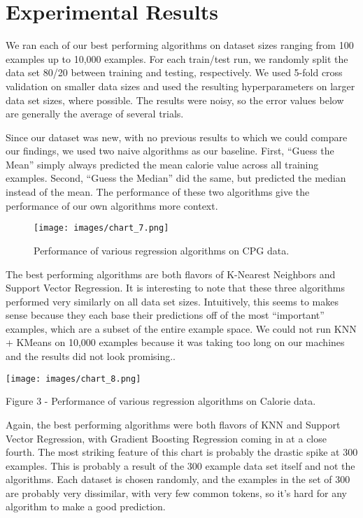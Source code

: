\documentclass{article}
\begin{document}
\section{Experimental Results}
We ran each of our best performing algorithms on dataset sizes ranging from 100 examples up to 10,000 examples. For each train/test run, we randomly split the data set 80/20 between training and testing, respectively. We used 5-fold cross validation on smaller data sizes and used the resulting hyperparameters on larger data set sizes, where possible. The results were noisy, so the error values below are generally the average of several trials.

Since our dataset was new, with no previous results to which we could compare our findings, we used two naive algorithms as our baseline. First, “Guess the Mean” simply always predicted the mean calorie value across all training examples. Second, “Guess the Median” did the same, but predicted the median instead of the mean. The performance of these two algorithms give the performance of our own algorithms more context.

\begin{figure}[ht!]
\centering
\texttt{[image: images/chart\_7.png]}
\caption{Performance of various regression algorithms on CPG data.}
\label{Figure 2}
\end{figure}

The best performing algorithms are both flavors of K-Nearest Neighbors and Support Vector Regression. It is interesting to note that these three algorithms performed very similarly on all data set sizes. Intuitively, this seems to makes sense because they each base their predictions off of the most “important” examples, which are a subset of the entire example space. We could not run KNN + KMeans on 10,000 examples because it was taking too long on our machines and the results did not look promising..

\begin{center}
\texttt{[image: images/chart\_8.png]}

Figure 3 - Performance of various regression algorithms on Calorie data.
\end{center}

Again, the best performing algorithms were both flavors of KNN and Support Vector Regression, with Gradient Boosting Regression coming in at a close fourth. The most striking feature of this chart is probably the drastic spike at 300 examples. This is probably a result of the 300 example data set itself and not the algorithms. Each dataset is chosen randomly, and the examples in the set of 300 are probably very dissimilar, with very few common tokens, so it’s hard for any algorithm to make a good prediction.
\end{document}
